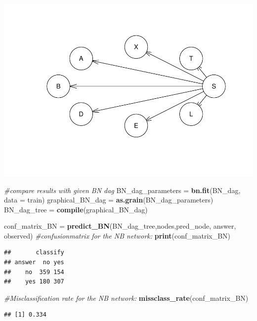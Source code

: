 \documentclass[]{article}
\newenvironment{Shaded}{\begin{snugshade}}{\end{snugshade}}
\newcommand{\CommentTok}[1]{\textcolor[rgb]{0.56,0.35,0.01}{\textit{#1}}}
\newcommand{\DataTypeTok}[1]{\textcolor[rgb]{0.13,0.29,0.53}{#1}}
\newcommand{\KeywordTok}[1]{\textcolor[rgb]{0.13,0.29,0.53}{\textbf{#1}}}
\newcommand{\NormalTok}[1]{#1}
\newcommand{\StringTok}[1]{\textcolor[rgb]{0.31,0.60,0.02}{#1}}
\begin{document}
\includegraphics{Lab1_graphical_models_alive213_files/figure-latex/unnamed-chunk-6-1.pdf}

\begin{Shaded}
\begin{Highlighting}[]
\CommentTok{#compare results with given BN dag}
\NormalTok{BN_dag_parameters =}\StringTok{ }\KeywordTok{bn.fit}\NormalTok{(BN_dag, }\DataTypeTok{data =}\NormalTok{ train)}
\NormalTok{graphical_BN_dag =}\StringTok{ }\KeywordTok{as.grain}\NormalTok{(BN_dag_parameters)}
\NormalTok{BN_dag_tree =}\StringTok{ }\KeywordTok{compile}\NormalTok{(graphical_BN_dag)}

\NormalTok{conf_matrix_BN =}\StringTok{ }\KeywordTok{predict_BN}\NormalTok{(BN_dag_tree,nodes,pred_node, answer, observed) }
\CommentTok{#confusionmatrix for the NB network:}
\KeywordTok{print}\NormalTok{(conf_matrix_BN)}
\end{Highlighting}
\end{Shaded}

\begin{verbatim}
##       classify
## answer  no yes
##    no  359 154
##    yes 180 307
\end{verbatim}

\begin{Shaded}
\begin{Highlighting}[]
\CommentTok{#Misclassification rate for the NB network:}
\KeywordTok{missclass_rate}\NormalTok{(conf_matrix_BN)}
\end{Highlighting}
\end{Shaded}

\begin{verbatim}
## [1] 0.334
\end{verbatim}
\end{document}
